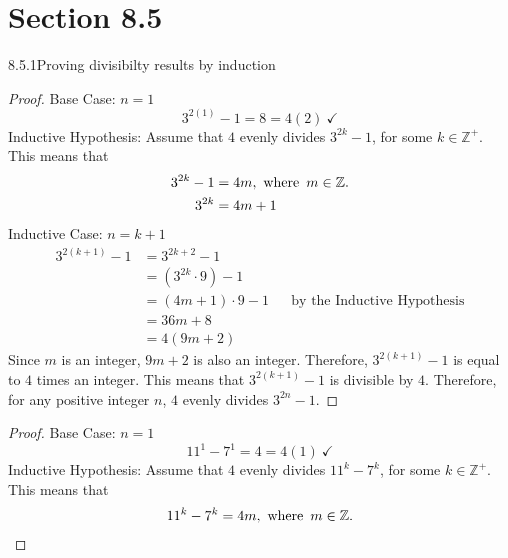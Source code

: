 


\newcommand{\assignment}{Section 8.5}

\chead{\assignment}


\section*{\assignment}

\begin{question}{8.5.1}{Proving divisibilty results by induction}
  \begin{proof}
    Base Case: $n=1$
    \[
      3^{2(1)} - 1 = 8 = 4(2)~\checkmark
    \]
    Inductive Hypothesis: Assume that $4$ evenly divides $3^{2k}-1$, for some $k\in \mathbb{Z}^+$. This means that
    \begin{align*}
      3^{2k}-1 & = 4m, \operatorname{~\text{where}~} m\in \mathbb{Z}. \\
      3^{2k}   & = 4m+1
    \end{align*}
    Inductive Case: $n = k+1$
    \begin{align*}
      3^{2(k+1)}-1 & = 3^{2k+2}-1                                                 \\
                   & = (3^{2k}\cdot 9) -1                                         \\
                   & = (4m+1)\cdot 9 - 1  &  & \text{by the Inductive Hypothesis} \\
                   & = 36m + 8                                                    \\
                   & = 4(9m+2)
    \end{align*}
    Since $m$ is an integer, $9m+2$ is also an integer. Therefore, $3^{2(k+1)}-1$ is equal to $4$ times an integer. This means that $3^{2(k+1)}-1$ is divisible by $4$. Therefore, for any positive integer $n$, $4$ evenly divides $3^{2n}-1$.
  \end{proof}
  \begin{proof}
    Base Case: $n=1$
    \[
      11^1 - 7^1 = 4 = 4(1)~\checkmark
    \]
    Inductive Hypothesis: Assume that $4$ evenly divides $11^k-7^k$, for some $k\in \mathbb{Z}^+$. This means that
    \begin{align*}
      11^k - 7^k & = 4m, \twhere m\in \mathbb{Z}. \\

\end{align*}
\end{proof}
\end{question}
